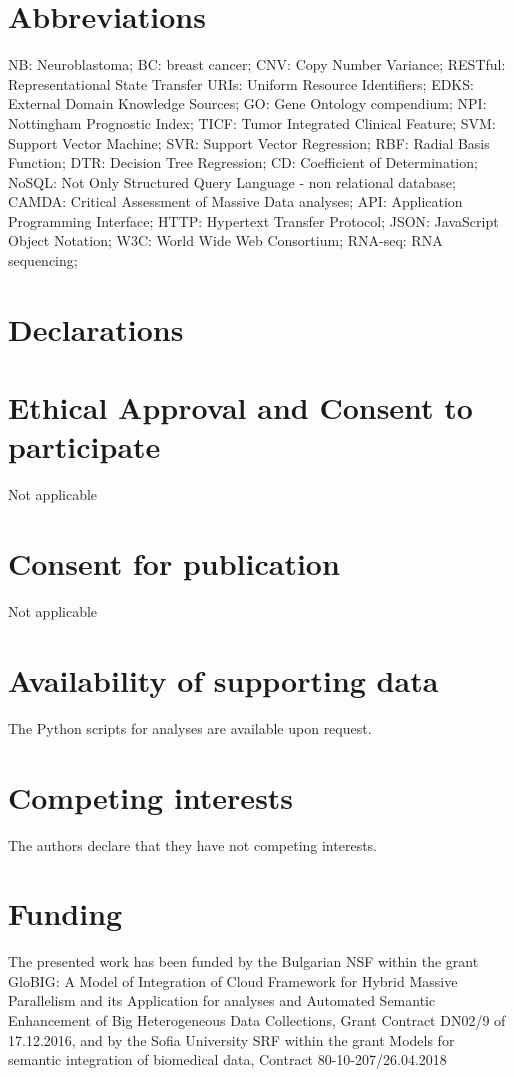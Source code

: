 \documentclass{bmcart}
\begin{document}
\begin{backmatter}

\section*{Abbreviations}
NB: Neuroblastoma; BC: breast cancer; CNV: Copy Number Variance; RESTful: Representational State Transfer
URIs: Uniform Resource Identifiers;  EDKS: External Domain Knowledge Sources; GO: Gene Ontology compendium;
NPI: Nottingham Prognostic Index;  TICF: Tumor Integrated Clinical Feature;  SVM: Support Vector Machine;
SVR: Support Vector Regression; RBF: Radial Basis Function; DTR: Decision Tree Regression; CD: Coefficient of Determination;
NoSQL: Not Only Structured Query Language - non relational database; CAMDA: Critical Assessment of Massive Data analyses;
API: Application Programming Interface; HTTP: Hypertext Transfer Protocol; JSON:  JavaScript Object Notation;
W3C:  World Wide Web Consortium; RNA-seq: RNA sequencing;

\section*{Declarations}

\section*{Ethical Approval and Consent to participate}
Not applicable
\section*{Consent for publication}
Not applicable
\section*{Availability of supporting data}
The Python scripts for analyses are available upon request.
\section*{Competing interests}
The authors declare that they have not competing interests.
\section*{Funding}
The presented work has been funded by the Bulgarian NSF within the grant GloBIG: A
Model of Integration of Cloud Framework for Hybrid Massive Parallelism and its Application
for analyses and Automated Semantic Enhancement of Big Heterogeneous Data Collections,
Grant Contract DN02/9 of 17.12.2016, and by the Sofia University SRF within the grant
Models for semantic integration of biomedical data, Contract 80-10-207/26.04.2018


\end{backmatter}
\end{document}
